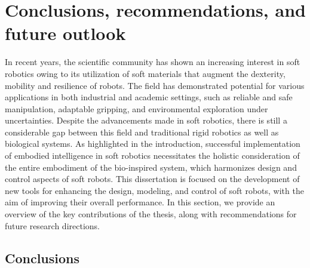 \chapter[Conclusions, recommendations, and outlook]{Conclusions, recommendations, and future outlook}
\label{chap: conclusions}
\thispagestyle{empty}
In recent years, the scientific community has shown an increasing interest in soft robotics owing to its utilization of soft materials that augment the dexterity, mobility and resilience of robots. The field has demonstrated potential for various applications in both industrial and academic settings, such as reliable and safe manipulation, adaptable gripping, and environmental exploration under uncertainties. Despite the advancements made in soft robotics, there is still a considerable gap between this field and traditional rigid robotics as well as biological systems. As highlighted in the introduction, successful implementation of embodied intelligence in soft robotics necessitates the holistic consideration of the entire embodiment of the bio-inspired system, which harmonizes design and control aspects of soft robots. This dissertation is focused on the development of new tools for enhancing the design, modeling, and control of soft robots, with the aim of improving their overall performance. In this section, we provide an overview of the key contributions of the thesis, along with recommendations for future research directions.

\section{Conclusions}



